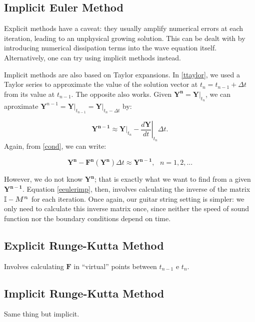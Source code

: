 \documentclass{article}
\begin{document}
\subsection{Implicit Euler Method}

Explicit methods have a caveat: they usually amplify numerical errors at each iteration, leading to an unphysical growing solution. This can be dealt with by introducing numerical dissipation terms into the wave equation itself. Alternatively, one can try using implicit methods instead.

Implicit methods are also based on Taylor expansions. In \eqref{ttaylor}, we used a Taylor series to approximate the value of the solution vector at $t_n=t_{n-1}+\Delta t$ from its value at $t_{n-1}$. The opposite also works. Given $\bm{Y^n}=\left.\bm{Y}\right|_{t_n}$, we can aproximate $\bm{Y}^{n-1}=\left.\bm{Y}\right|_{t_{n-1}}=\left.\bm{Y}\right|_{t_n-\Delta t}$ by:

\begin{equation}\label{ttaylorimp}
\bm{Y^{n-1}}\approx\left.\bm{Y}\right|_{t_{n}}-\left.\frac{d \bm{Y}}{d t}\right|_{t_{n}}\Delta t.
\end{equation}
Again, from \eqref{cond}, we can write:

\begin{equation}\label{eeulerimp}
\boxed{\bm{Y^{n}}-\bm{F^{n}}(\bm{Y^n})\Delta t\approx\bm{Y^{n-1}}, \text{ }n=1,2,...}
\end{equation}

However, we do not know $\bm{Y^n}$; that is exactly what we want to find from a given $\bm{Y^{n-1}}$. Equation \eqref{eeulerimp}, then, involves calculating the inverse of the matrix $\bm{\mathbb{I}}-\textcolor{grayII}{\bm{M^n}}$ for each iteration. Once again, our guitar string setting is simpler: we only need to calculate this inverse matrix once, since neither the speed of sound function nor the boundary conditions depend on time.

\subsection{Explicit Runge-Kutta Method}
Involves calculating $\bm{F}$ in ``virtual'' points between $t_{n-1}$ e $t_{n}$.

\subsection{Implicit Runge-Kutta Method}
Same thing but implicit.
\end{document}
